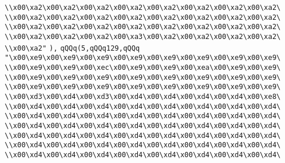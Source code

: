 \verb|\\x00\xa2\x00\xa2\x00\xa2\x00\xa2\x00\xa2\x00\xa2\x00\xa2\x00\xa2\|\newline
\verb|\\x00\xa2\x00\xa2\x00\xa2\x00\xa2\x00\xa2\x00\xa2\x00\xa2\x00\xa2\|\newline
\verb|\\x00\xa2\x00\xa2\x00\xa2\x00\xa2\x00\xa2\x00\xa2\x00\xa2\x00\xa2\|\newline
\verb|\\x00\xa2\x00\xa2\x00\xa2\x00\xa3\x00\xa2\x00\xa2\x00\xa2\x00\xa2\|\newline
\verb|\\x00\xa2"|\newline
\verb|),|\newline
\verb|qQQq(5,qQQq129,qQQq|\newline
\verb|"\x00\xe9\x00\xe9\x00\xe9\x00\xe9\x00\xe9\x00\xe9\x00\xe9\x00\xe9\|\newline
\verb|\\x00\xe9\x00\xe9\x00\xec\x00\xe9\x00\xe9\x00\xea\x00\xe9\x00\xe9\|\newline
\verb|\\x00\xe9\x00\xe9\x00\xe9\x00\xe9\x00\xe9\x00\xe9\x00\xe9\x00\xe9\|\newline
\verb|\\x00\xe9\x00\xe9\x00\xe9\x00\xe9\x00\xe9\x00\xe9\x00\xe9\x00\xe9\|\newline
\verb|\\x00\xd3\x00\xd4\x00\xd3\x00\xd4\x00\xd4\x00\xd4\x00\xd4\x00\xe8\|\newline
\verb|\\x00\xd4\x00\xd4\x00\xd4\x00\xd4\x00\xd4\x00\xd4\x00\xd4\x00\xd4\|\newline
\verb|\\x00\xd4\x00\xd4\x00\xd4\x00\xd4\x00\xd4\x00\xd4\x00\xd4\x00\xd4\|\newline
\verb|\\x00\xd4\x00\xd4\x00\xd4\x00\xd4\x00\xd4\x00\xd4\x00\xd4\x00\xd4\|\newline
\verb|\\x00\xd4\x00\xd4\x00\xd4\x00\xd4\x00\xd4\x00\xd4\x00\xd4\x00\xd4\|\newline
\verb|\\x00\xd4\x00\xd4\x00\xd4\x00\xd4\x00\xd4\x00\xd4\x00\xd4\x00\xd4\|\newline
\verb|\\x00\xd4\x00\xd4\x00\xd4\x00\xd4\x00\xd4\x00\xd4\x00\xd4\x00\xd4\|\newline
